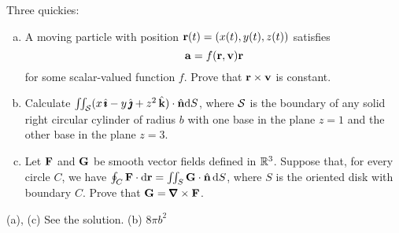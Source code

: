 \begin{question}[M317 2000D, 2001A] %
Three quickies:
\begin{enumerate}[(a)]
\item
A moving particle with position $\mathbf{r}(t) = (x(t),y(t),z(t))$
satisfies
$$
\mathbf{a} = f(\mathbf{r},\mathbf{v})\mathbf{r}
$$ for some scalar-valued function $f$.
Prove that $\mathbf{r}\times\mathbf{v}$ is constant.


\item
Calculate $\iint_{\mathcal{S}}(x\,\hat{\pmb{\imath}} - y\,\hat{\pmb{\jmath}} + z^2\,\hat{\mathbf{k}})\cdot \hat{\mathbf{n}}\mathrm{d}S$,
where $\mathcal{S}$ is the boundary of any solid right circular cylinder
of radius $b$ with one base in the plane $z=1$ and the other base in the
plane $z=3$.

\item
Let $\mathbf{F}$ and $\mathbf{G}$ be smooth vector fields defined in $\mathbb{R}^3$.
Suppose that, for every circle $C$, we have
$\oint_{C} \mathbf{F}\cdot \mathrm{d}\mathbf{r}=\iint_S \mathbf{G}\cdot \hat{\mathbf{n}}\,\mathrm{d}S$, where $S$ is the
oriented disk with boundary $C$.
Prove that $\vG=\vnabla\times\vF$.
\end{enumerate}

\end{question}


\begin{answer} 
(a), (c) See the solution.\qquad
(b) $8\pi b^2$
\end{answer}


